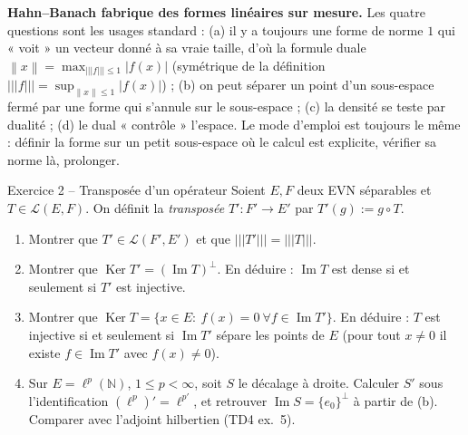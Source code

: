 \documentclass[11pt,a4paper]{article}
\newcommand{\N}{\mathbb{N}}
\newcommand{\norm}[1]{\left\|#1\right\|}
\newcommand{\opnorm}[1]{|\!|\!|#1|\!|\!|}
\newcommand{\Lc}{\mathcal{L}}
\DeclareMathOperator{\Ker}{Ker}
\DeclareMathOperator{\Ima}{Im}
\theoremstyle{definition}
\begin{document}
\begin{pointcle}
\textbf{Hahn--Banach fabrique des formes linéaires sur mesure.} Les quatre questions sont les usages standard : (a) il y a toujours une forme de norme $1$ qui « voit » un vecteur donné à sa vraie taille, d'où la formule duale $\norm x=\max_{\opnorm f\le1}|f(x)|$ (symétrique de la définition $\opnorm f=\sup_{\norm x\le1}|f(x)|$) ; (b) on peut séparer un point d'un sous-espace fermé par une forme qui s'annule sur le sous-espace ; (c) la densité se teste par dualité ; (d) le dual « contrôle » l'espace. Le mode d'emploi est toujours le même : définir la forme sur un petit sous-espace où le calcul est explicite, vérifier sa norme là, prolonger.
\end{pointcle}

\begin{exo}{Exercice 2 -- Transposée d'un opérateur}
Soient $E,F$ deux EVN séparables et $T\in\Lc(E,F)$. On définit la \emph{transposée} $T':F'\to E'$ par $T'(g):=g\circ T$.
\begin{enumerate}[label=(\alph*)]
  \item Montrer que $T'\in\Lc(F',E')$ et que $\opnorm{T'}=\opnorm T$.
  \item Montrer que $\Ker T'=(\Ima T)^\perp$. En déduire : $\Ima T$ est dense si et seulement si $T'$ est injective.
  \item Montrer que $\Ker T=\{x\in E:\ f(x)=0\ \forall f\in\Ima T'\}$. En déduire : $T$ est injective si et seulement si $\Ima T'$ sépare les points de $E$ (pour tout $x\ne0$ il existe $f\in\Ima T'$ avec $f(x)\ne0$).
  \item Sur $E=\ell^p(\N)$, $1\le p<\infty$, soit $S$ le décalage à droite. Calculer $S'$ sous l'identification $(\ell^p)'=\ell^{p'}$, et retrouver $\Ima S=\{e_0\}^{\perp}$ à partir de (b). Comparer avec l'adjoint hilbertien (TD4 ex.~5).
\end{enumerate}
\end{exo}
\end{document}
